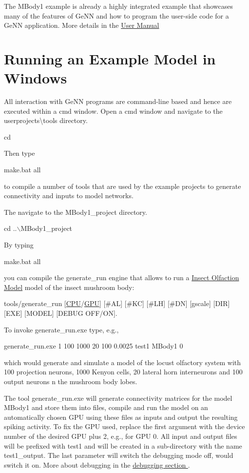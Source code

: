 The M\+Body1 example is already a highly integrated example that showcases many of the features of Ge\+N\+N and how to program the user-\/side code for a Ge\+N\+N application. More details in the \hyperlink{UserManual_sec}{User Manual }\hypertarget{Quickstart_sec_windows_quick}{}\section{Running an Example Model in Windows}\label{Quickstart_sec_windows_quick}
All interaction with Ge\+N\+N programs are command-\/line based and hence are executed within a {\ttfamily cmd} window. Open a {\ttfamily cmd} window and navigate to the {\ttfamily userprojects\textbackslash{}tools} directory. 
\begin{DoxyCode}
cd %
\end{DoxyCode}
 Then type 
\begin{DoxyCode}
make.bat all
\end{DoxyCode}
 to compile a number of tools that are used by the example projects to generate connectivity and inputs to model networks.

The navigate to the {\ttfamily M\+Body1\+\_\+project} directory. 
\begin{DoxyCode}
cd ..\(\backslash\)MBody1\_project
\end{DoxyCode}
 By typing 
\begin{DoxyCode}
make.bat all
\end{DoxyCode}
 you can compile the {\ttfamily generate\+\_\+run} engine that allows to run a \hyperlink{Examples_sec_ex_mbody}{Insect Olfaction Model} model of the insect mushroom body\+: 
\begin{DoxyCode}
tools/generate\_run [\hyperlink{modelSpec_8h_ad703205f9a4d4bb6af9c25257c23ce6d}{CPU}/\hyperlink{modelSpec_8h_a39cb9803524b6f3b783344b2f89867b4}{GPU}] [#AL] [#KC] [#LH] [#DN] [gscale] [DIR] [EXE] [MODEL] [DEBUG OFF/ON]. 
\end{DoxyCode}
 To invoke {\ttfamily generate\+\_\+run.\+exe} type, e.\+g., 
\begin{DoxyCode}
generate\_run.exe 1 100 1000 20 100 0.0025 test1 MBody1 0 
\end{DoxyCode}
 which would generate and simulate a model of the locust olfactory system with 100 projection neurons, 1000 Kenyon cells, 20 lateral horn interneurons and 100 output neurons n the mushroom body lobes.

The tool {\ttfamily generate\+\_\+run.\+exe} will generate connectivity matrices for the model {\ttfamily M\+Body1} and store them into files, compile and run the model on an automatically chosen G\+P\+U using these files as inputs and output the resulting spiking activity. To fix the G\+P\+U used, replace the first argument {} with the device number of the desired G\+P\+U plus 2, e.\+g., {} for G\+P\+U 0. All input and output files will be prefixed with {\ttfamily test1} and will be created in a sub-\/directory with the name {\ttfamily test1\+\_\+output}. The last parameter {} will switch the debugging mode off, {} would switch it on. More about debugging in the \hyperlink{}{debugging section }.

